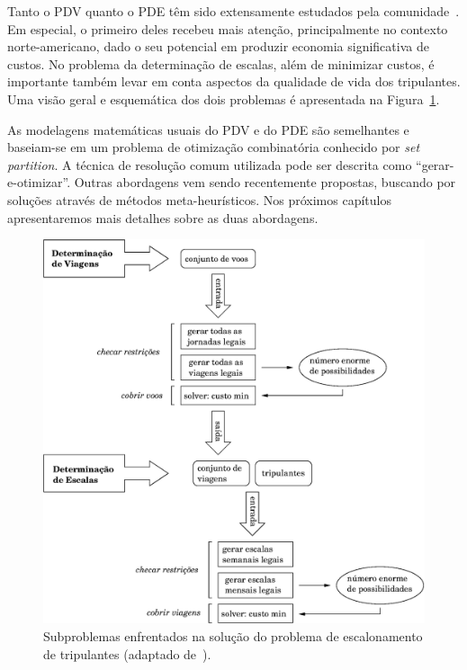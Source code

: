 Tanto o PDV quanto o PDE têm sido extensamente estudados pela comunidade~\cite{gopalakrishnan05}. Em
especial, o primeiro deles recebeu mais atenção, principalmente no contexto norte-americano, dado o
seu potencial em produzir economia significativa de custos. No problema da determinação de escalas,
além de minimizar custos, é importante também levar em conta aspectos da qualidade de vida dos
tripulantes. Uma visão geral e esquemática dos dois problemas é apresentada na
Figura~\ref{fig:escalonamento}.

As modelagens matemáticas usuais do PDV e do PDE são semelhantes e baseiam-se em um problema de 
otimização combinatória conhecido por \emph{set partition}. A técnica de resolução comum utilizada 
pode ser descrita como ``gerar-e-otimizar''. Outras abordagens vem sendo recentemente propostas, 
buscando por soluções através de métodos meta-heurísticos. Nos próximos capítulos apresentaremos 
mais detalhes sobre as duas abordagens.

\begin{figure}[htbp]
	\begin{center}
		\includegraphics[scale=0.5]{fig/escalonamento.eps}
		\caption{Subproblemas enfrentados na solução do problema de escalonamento de tripulantes 
		(adaptado de~\cite{souai09}).}
		\label{fig:escalonamento}
	\end{center}
\end{figure}

